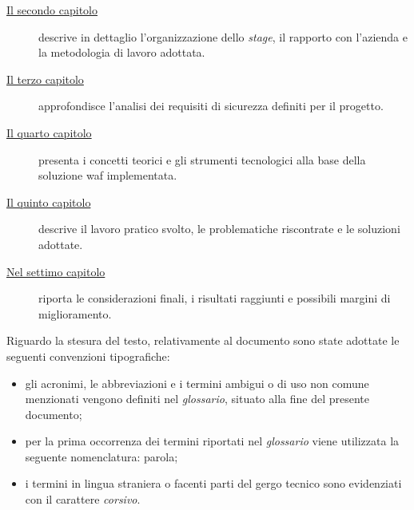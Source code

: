 \begin{description}
    \item[{\hyperref[cap:descrizione-stage]{Il secondo capitolo}}] descrive in dettaglio l'organizzazione dello \emph{stage}, il rapporto con l'azienda e la metodologia di lavoro adottata.
    
    \item[{\hyperref[cap:analisi-requisiti]{Il terzo capitolo}}] approfondisce l'analisi dei requisiti di sicurezza definiti per il progetto.
    
    \item[{\hyperref[cap:introduzione-teorica]{Il quarto capitolo}}] presenta i concetti teorici e gli strumenti tecnologici alla base della soluzione \gls{waf} implementata.
    
    \item[{\hyperref[cap:implementazione-risultati]{Il quinto capitolo}}] descrive il lavoro pratico svolto, le problematiche riscontrate e le soluzioni adottate.
        
    \item[{\hyperref[cap:conclusioni]{Nel settimo capitolo}}] riporta le considerazioni finali, i risultati raggiunti e possibili margini di miglioramento.
\end{description}

Riguardo la stesura del testo, relativamente al documento sono state adottate le seguenti convenzioni tipografiche:
\begin{itemize}
	\item gli acronimi, le abbreviazioni e i termini ambigui o di uso non comune menzionati vengono definiti nel \emph{glossario}, situato alla fine del presente documento;
	\item per la prima occorrenza dei termini riportati nel \emph{glossario} viene utilizzata la seguente nomenclatura: parola\glsfirstoccur;
	\item i termini in lingua straniera o facenti parti del gergo tecnico sono evidenziati con il carattere \emph{corsivo}.
\end{itemize}
